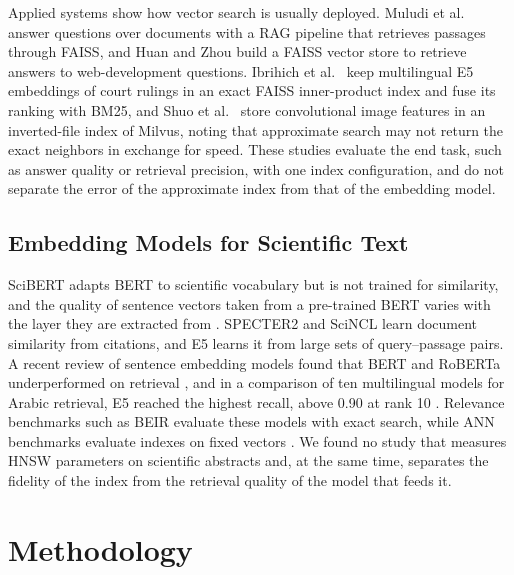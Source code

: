 \documentclass[conference, letterpaper]{IEEEtran}
\begin{document}
Applied systems show how vector search is usually deployed. Muludi et al.~\cite{muludi2024} answer questions over documents with a RAG pipeline that retrieves passages through FAISS, and Huan and Zhou \cite{huan2024} build a FAISS vector store to retrieve answers to web-development questions. Ibrihich et al.~\cite{ibrihich2026} keep multilingual E5 embeddings of court rulings in an exact FAISS inner-product index and fuse its ranking with BM25, and Shuo et al.~\cite{shuo2024} store convolutional image features in an inverted-file index of Milvus, noting that approximate search may not return the exact neighbors in exchange for speed. These studies evaluate the end task, such as answer quality or retrieval precision, with one index configuration, and do not separate the error of the approximate index from that of the embedding model.

\subsection{Embedding Models for Scientific Text}

SciBERT \cite{beltagy2019} adapts BERT \cite{devlin2019} to scientific vocabulary but is not trained for similarity, and the quality of sentence vectors taken from a pre-trained BERT varies with the layer they are extracted from \cite{alsuhaibani2023}. SPECTER2 \cite{singh2023} and SciNCL \cite{ostendorff2022} learn document similarity from citations, and E5 \cite{wang2022} learns it from large sets of query--passage pairs. A recent review of sentence embedding models found that BERT and RoBERTa underperformed on retrieval \cite{ajallouda2025}, and in a comparison of ten multilingual models for Arabic retrieval, E5 reached the highest recall, above 0.90 at rank 10 \cite{abdelazim2023}. Relevance benchmarks such as BEIR \cite{thakur2021} evaluate these models with exact search, while ANN benchmarks evaluate indexes on fixed vectors \cite{aumuller2020}. We found no study that measures HNSW parameters on scientific abstracts and, at the same time, separates the fidelity of the index from the retrieval quality of the model that feeds it.

\section{Methodology}
\label{sec:method}
\end{document}
